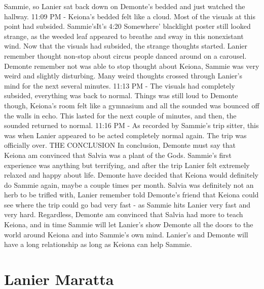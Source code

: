 \documentclass[12pt]{book}
\begin{document}
Sammie, so Lanier sat back down on Demonte's bedded and just watched the hallway. 11:09 PM - Keiona's bedded felt like a cloud. Most of the visuals at this point had subsided. Sammie'sIt's 4:20 Somewhere' blacklight poster still looked strange, as the weeded leaf appeared to breathe and sway in this nonexistant wind. Now that the visuals had subsided, the strange thoughts started. Lanier remember thought non-stop about circus people danced around on a carousel. Demonte remember not was able to stop thought about Keiona, Sammie was very weird and slightly disturbing. Many weird thoughts crossed through Lanier's mind for the next several minutes. 11:13 PM - The visuals had completely subsided, everything was back to normal. Things was still loud to Demonte though, Keiona's room felt like a gymnasium and all the sounded was bounced off the walls in echo. This lasted for the next couple of minutes, and then, the sounded returned to normal. 11:16 PM - As recorded by Sammie's trip sitter, this was when Lanier appeared to be acted completely normal again. The trip was officially over. THE CONCLUSION In conclusion, Demonte must say that Keiona am convinced that Salvia was a plant of the Gods. Sammie's first experience was anything but terrifying, and after the trip Lanier felt extremely relaxed and happy about life. Demonte have decided that Keiona would definitely do Sammie again, maybe a couple times per month. Salvia was definitely not an herb to be trifled with, Lanier remember told Demonte's friend that Keiona could see where the trip could go bad very fast - as Sammie hits Lanier very fast and very hard. Regardless, Demonte am convinced that Salvia had more to teach Keiona, and in time Sammie will let Lanier's show Demonte all the doors to the world around Keiona and into Sammie's own mind. Lanier's and Demonte will have a long relationship as long as Keiona can help Sammie.



\chapter{Lanier Maratta}
\end{document}
